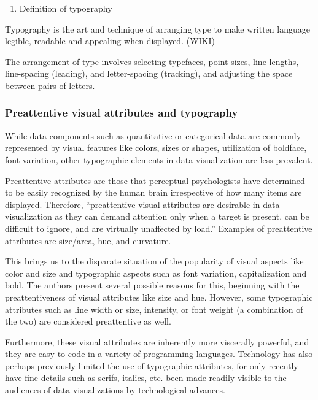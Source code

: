 \documentclass[]{book}
\providecommand{\tightlist}{%
  \setlength{\itemsep}{0pt}\setlength{\parskip}{0pt}}
\theoremstyle{definition}
\theoremstyle{definition}
\theoremstyle{definition}
\theoremstyle{remark}
\begin{document}
\begin{enumerate}
\def\labelenumi{\arabic{enumi}.}
\tightlist
\item
  Definition of typography
\end{enumerate}

Typography is the art and technique of arranging type to make written
language legible, readable and appealing when displayed.
(\href{https://en.wikipedia.org/wiki/Typography}{WIKI})

The arrangement of type involves selecting typefaces, point sizes, line
lengths, line-spacing (leading), and letter-spacing (tracking), and
adjusting the space between pairs of letters.

\subsubsection{Preattentive visual attributes and
typography}\label{preattentive-visual-attributes-and-typography}

While data components such as quantitative or categorical data are
commonly represented by visual features like colors, sizes or shapes,
utilization of boldface, font variation, other typographic elements in
data visualization are less prevalent.

Preattentive attributes are those that perceptual psychologists have
determined to be easily recognized by the human brain irrespective of
how many items are displayed. Therefore, ``preattentive visual
attributes are desirable in data visualization as they can demand
attention only when a target is present, can be difficult to ignore, and
are virtually unaffected by load.'' Examples of preattentive attributes
are size/area, hue, and curvature.

This brings us to the disparate situation of the popularity of visual
aspects like color and size and typographic aspects such as font
variation, capitalization and bold. The authors present several possible
reasons for this, beginning with the preattentiveness of visual
attributes like size and hue. However, some typographic attributes such
as line width or size, intensity, or font weight (a combination of the
two) are considered preattentive as well.

Furthermore, these visual attributes are inherently more viscerally
powerful, and they are easy to code in a variety of programming
languages. Technology has also perhaps previously limited the use of
typographic attributes, for only recently have fine details such as
serifs, italics, etc. been made readily visible to the audiences of data
visualizations by technological advances.
\end{document}
